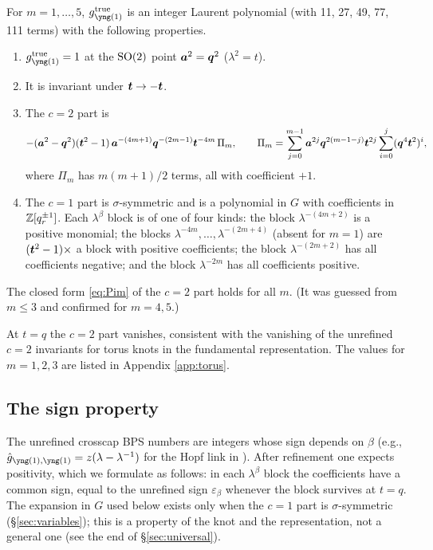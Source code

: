 \begin{result}\label{cr:torus}
For $m = 1, \dots, 5$, $g^{\mathrm{true}}_{\yone}$ is an integer Laurent polynomial (with 11, 27, 49, 77, 111 terms) with the following properties.
\begin{enumerate} %
\item[(N)] $g^{\mathrm{true}}_{\yone} = 1$ at the $\mathrm{SO}(2)$ point $\bm{a}^2 = \bm{q}^2$ ($\lambda^2 = t$).
\item[(P)] It is invariant under $\bm{t} \to -\bm{t}$.
\item[($c{=}2$)] The $c = 2$ part is
\begin{equation}\label{eq:Pim}
-(\bm{a}^2 - \bm{q}^2)(\bm{t}^2 - 1)\,\bm{a}^{-(4m+1)}\bm{q}^{-(2m-1)}\bm{t}^{-4m}\,\Pi_m,\qquad
\Pi_m = \sum_{j=0}^{m-1}\bm{a}^{2j}\bm{q}^{2(m-1-j)}\bm{t}^{2j}\sum_{i=0}^{j}(\bm{q}^4\bm{t}^2)^i ,
\end{equation}
where $\Pi_m$ has $m(m+1)/2$ terms, all with coefficient $+1$.
\item[($c{=}1$)] The $c = 1$ part is $\sigma$-symmetric and is a polynomial in $G$ with coefficients in $\mathbb{Z}[q_r^{\pm1}]$. Each $\lambda^\beta$ block is of one of four kinds: the block $\lambda^{-(4m+2)}$ is a positive monomial; the blocks $\lambda^{-4m}, \dots, \lambda^{-(2m+4)}$ (absent for $m = 1$) are $(\bm{t}^2 - 1)\times$ a block with positive coefficients; the block $\lambda^{-(2m+2)}$ has all coefficients negative; and the block $\lambda^{-2m}$ has all coefficients positive.
\end{enumerate}
\end{result}
\begin{conjecture}\label{conj:Pim}
The closed form \eqref{eq:Pim} of the $c = 2$ part holds for all $m$. (It was guessed from $m \le 3$ and confirmed for $m = 4, 5$.)
\end{conjecture}
At $t = q$ the $c = 2$ part vanishes, consistent with the vanishing of the unrefined $c = 2$ invariants for torus knots in the fundamental representation. The values for $m = 1, 2, 3$ are listed in Appendix \ref{app:torus}.

\subsection{The sign property}\label{sec:criterion}
The unrefined crosscap BPS numbers are integers whose sign depends on $\beta$ (e.g., $\hat g_{\yone,\yone} = z(\lambda - \lambda^{-1})$ for the Hopf link in \cite{Marino09}). After refinement one expects positivity, which we formulate as follows: in each $\lambda^\beta$ block the coefficients have a common sign, equal to the unrefined sign $\varepsilon_\beta$ whenever the block survives at $t = q$. The expansion in $G$ used below exists only when the $c = 1$ part is $\sigma$-symmetric (\S\ref{sec:variables}); this is a property of the knot and the representation, not a general one (see the end of \S\ref{sec:universal}).

